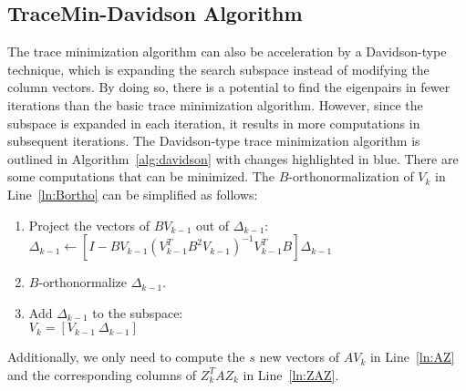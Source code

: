 \subsection{TraceMin-Davidson Algorithm}
The trace minimization algorithm can also be acceleration by a Davidson-type technique, which is expanding the
search subspace instead of modifying the column vectors. By doing so, there is a potential to find the eigenpairs
in fewer iterations than the basic trace minimization algorithm. However, since the subspace is expanded in each
iteration, it results in more computations in subsequent iterations. The Davidson-type trace minimization algorithm
is outlined in Algorithm~\ref{alg:davidson} with changes highlighted in blue.
There are some computations that can be minimized\cite{klinvex}. The $B$-orthonormalization of $V_k$ in
Line~\ref{ln:Bortho} can be simplified as follows:
\begin{enumerate}
	\item Project the vectors of $B V_{k-1}$ out of $\Delta_{k-1}$:\\
		$\Delta_{k-1} \leftarrow \left[I - BV_{k-1}\left(V_{k-1}^T B^2 V_{k-1}\right)^{-1} V_{k-1}^T B\right]\Delta_{k-1}$
	\item $B$-orthonormalize $\Delta_{k-1}$.
	\item Add $\Delta_{k-1}$ to the subspace:\\
		$V_k = [V_{k-1}\ \Delta_{k-1}]$
\end{enumerate}
Additionally, we only need to compute the $s$ new vectors of $AV_k$ in Line~\ref{ln:AZ} and the corresponding columns
of $Z_k^T A Z_k$ in Line~\ref{ln:ZAZ}.
